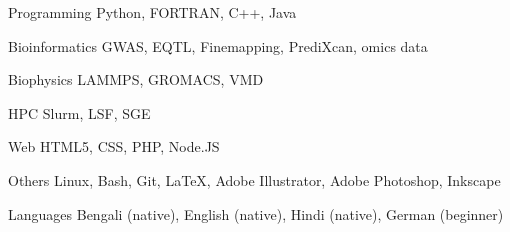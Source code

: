 


\begin{cvskills}


\cvskill
{Programming} %
{Python, FORTRAN, C++, Java} %


\cvskill
{Bioinformatics}
{GWAS, EQTL, Finemapping, PrediXcan, omics data}


\cvskill
{Biophysics} %
{LAMMPS, GROMACS, VMD} %


\cvskill
{HPC}
{Slurm, LSF, SGE}


\cvskill
{Web} %
{HTML5, CSS, PHP, Node.JS} %


\cvskill
{Others} %
{Linux, Bash, Git, {\LaTeX}, Adobe Illustrator, Adobe Photoshop, Inkscape} %


\cvskill
{Languages} %
{Bengali (native), English (native), Hindi (native), German (beginner)} %


\end{cvskills}
